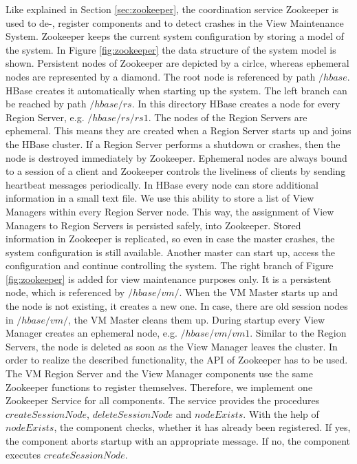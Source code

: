 \documentclass[11pt,a4paper,bibtotoc,idxtotoc,headsepline,footsepline,footexclude,BCOR12mm,DIV13]{scrbook}
\begin{document}
Like explained in Section \ref{sec:zookeeper}, the coordination service Zookeeper is used to de-, register components and to detect crashes in the View Maintenance System. Zookeeper keeps the current system configuration by storing a model of the system.  In Figure \ref{fig:zookeeper} the data structure of the system model is shown. Persistent nodes of Zookeeper are depicted by a cirlce, whereas ephemeral nodes are represented by a diamond. The root node is referenced by path $/hbase$. HBase creates it automatically when starting up the system. The left branch can be reached by path $/hbase/rs$. In this directory HBase creates a node for every Region Server, e.g. $/hbase/rs/rs1$. The nodes of the Region Servers are ephemeral. This means they are created when a Region Server starts up and joins the HBase cluster. If a Region Server performs a shutdown or crashes, then the node is destroyed immediately by Zookeeper. Ephemeral nodes are always bound to a session of a client and Zookeeper controls the liveliness of clients by sending heartbeat messages periodically. In HBase every node can store additional information in a small text file. We use this ability to store a list of View Managers within every Region Server node. This way, the assignment of View Managers to Region Servers is persisted safely, into Zookeeper. Stored information in Zookeeper is replicated, so even in case the master crashes, the system configuration is still available. Another master can start up, access the configuration and continue controlling the system. The right branch of Figure \ref{fig:zookeeper} is added for view maintenance purposes only. It is a persistent node, which is referenced by $/hbase/vm/$. When the VM Master starts up and the node is not existing, it creates a new one. In case, there are old session nodes in $/hbase/vm/$, the VM Master cleans them up. During startup every View Manager creates an ephemeral node, e.g. $/hbase/vm/vm1$. Similar to the Region Servers, the node is deleted as soon as the View Manager leaves the cluster. 
In order to realize the described functionality, the API of Zookeeper has to be used.  The VM Region Server and the View Manager components use the same Zookeeper functions to register themselves. Therefore, we implement one Zookeeper Service for all components. The service provides the procedures $createSessionNode$, $deleteSessionNode$ and $nodeExists$. With the help of $nodeExists$, the component checks, whether it has already been registered. If yes, the component aborts startup with an appropriate message. If no, the component executes $createSessionNode$. 
\end{document}
